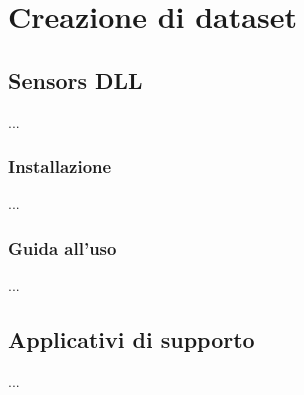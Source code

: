 \section{Creazione di dataset}
\lipsum[2]

\subsection{Sensors DLL}
...

\subsubsection{Installazione}
...

\subsubsection{Guida all'uso}
...

\subsection{Applicativi di supporto}
...
